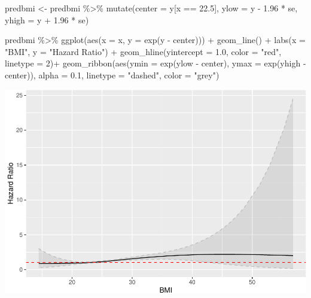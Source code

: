 \documentclass[
]{book}
\newenvironment{Shaded}{\begin{snugshade}}{\end{snugshade}}
\newcommand{\AttributeTok}[1]{\textcolor[rgb]{0.77,0.63,0.00}{#1}}
\newcommand{\DecValTok}[1]{\textcolor[rgb]{0.00,0.00,0.81}{#1}}
\newcommand{\FloatTok}[1]{\textcolor[rgb]{0.00,0.00,0.81}{#1}}
\newcommand{\FunctionTok}[1]{\textcolor[rgb]{0.00,0.00,0.00}{#1}}
\newcommand{\NormalTok}[1]{#1}
\newcommand{\OtherTok}[1]{\textcolor[rgb]{0.56,0.35,0.01}{#1}}
\newcommand{\SpecialCharTok}[1]{\textcolor[rgb]{0.00,0.00,0.00}{#1}}
\newcommand{\StringTok}[1]{\textcolor[rgb]{0.31,0.60,0.02}{#1}}
\begin{document}
\begin{Shaded}
\begin{Highlighting}[]
\NormalTok{predbmi }\OtherTok{\textless{}{-}}\NormalTok{ predbmi }\SpecialCharTok{\%\textgreater{}\%}
  \FunctionTok{mutate}\NormalTok{(}\AttributeTok{center =}\NormalTok{ y[x }\SpecialCharTok{==} \FloatTok{22.5}\NormalTok{],}
         \AttributeTok{ylow =}\NormalTok{ y }\SpecialCharTok{{-}} \FloatTok{1.96} \SpecialCharTok{*}\NormalTok{ se,}
         \AttributeTok{yhigh =}\NormalTok{ y }\SpecialCharTok{+} \FloatTok{1.96} \SpecialCharTok{*}\NormalTok{ se)}

\NormalTok{predbmi }\SpecialCharTok{\%\textgreater{}\%}
  \FunctionTok{ggplot}\NormalTok{(}\FunctionTok{aes}\NormalTok{(}\AttributeTok{x =}\NormalTok{ x, }\AttributeTok{y =} \FunctionTok{exp}\NormalTok{(y }\SpecialCharTok{{-}}\NormalTok{ center))) }\SpecialCharTok{+} 
  \FunctionTok{geom\_line}\NormalTok{() }\SpecialCharTok{+}
  \FunctionTok{labs}\NormalTok{(}\AttributeTok{x =} \StringTok{"BMI"}\NormalTok{, }
       \AttributeTok{y =} \StringTok{"Hazard Ratio"}\NormalTok{) }\SpecialCharTok{+} 
  \FunctionTok{geom\_hline}\NormalTok{(}\AttributeTok{yintercept =} \FloatTok{1.0}\NormalTok{, }\AttributeTok{color =} \StringTok{"red"}\NormalTok{, }\AttributeTok{linetype =} \DecValTok{2}\NormalTok{)}\SpecialCharTok{+}
  \FunctionTok{geom\_ribbon}\NormalTok{(}\FunctionTok{aes}\NormalTok{(}\AttributeTok{ymin =} \FunctionTok{exp}\NormalTok{(ylow }\SpecialCharTok{{-}}\NormalTok{ center), }\AttributeTok{ymax =} \FunctionTok{exp}\NormalTok{(yhigh }\SpecialCharTok{{-}}\NormalTok{ center)), }
              \AttributeTok{alpha =} \FloatTok{0.1}\NormalTok{, }
              \AttributeTok{linetype =} \StringTok{"dashed"}\NormalTok{,}
              \AttributeTok{color =} \StringTok{"grey"}\NormalTok{)}
\end{Highlighting}
\end{Shaded}

\includegraphics{adv_epi_analysis_files/figure-latex/unnamed-chunk-245-1.pdf}
\end{document}
